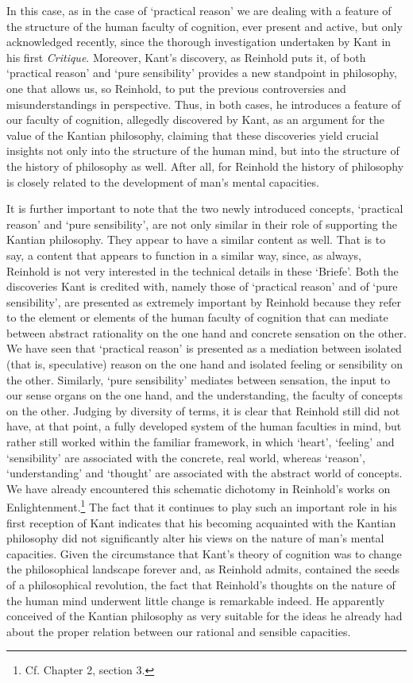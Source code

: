 In this case, as in the case of `practical reason' we are dealing with a feature of the structure of the human faculty of cognition, ever present and active, but only acknowledged recently, since the thorough investigation undertaken by Kant in his first \textit{Critique}. Moreover, Kant's discovery, as Reinhold puts it, of both `practical reason' and `pure sensibility' provides a new standpoint in philosophy, one that allows us, so Reinhold, to put the previous controversies and misunderstandings in perspective. Thus, in both cases, he introduces a feature of our faculty of cognition, allegedly discovered by Kant, as an argument for the value of the Kantian philosophy, claiming that these discoveries yield crucial insights not only into the structure of the human mind, but into the structure of the history of philosophy as well. After all, for Reinhold the history of philosophy is closely related to the development of man's mental capacities. 

 It is further important to note that the two newly introduced concepts, `practical reason' and `pure sensibility', are not only similar in their role of supporting the Kantian philosophy. They appear to have a similar content as well. That is to say, a content that appears to function in a similar way, since, as always, Reinhold is not very interested in the technical details in these `Briefe'. Both the discoveries Kant is credited with, namely those of `practical reason' and of `pure sensibility', are presented as extremely important by Reinhold because they refer to the element or elements of the human faculty of cognition that can mediate between abstract rationality on the one hand and concrete sensation on the other. We have seen that `practical reason' is presented as a mediation between isolated (that is, speculative) reason on the one hand and isolated feeling or sensibility on the other. Similarly, `pure sensibility' mediates between sensation, the input to our sense organs on the one hand, and the understanding, the faculty of concepts on the other. Judging by diversity of terms, it is clear that Reinhold still did not have, at that point, a fully developed system of the human faculties in mind, but rather still worked within the familiar framework, in which `heart', `feeling' and `sensibility' are associated with the concrete, real world, whereas `reason', `understanding' and `thought' are associated with the abstract world of concepts. We have already encountered this schematic dichotomy in Reinhold's works on Enlightenment.\footnote{ Cf. Chapter 2, section 3. } The fact that it continues to play such an important role in his first reception of Kant indicates that his becoming acquainted with the Kantian philosophy did not significantly alter his views on the nature of man's mental capacities. Given the circumstance that Kant's theory of cognition was to change the philosophical landscape forever and, as Reinhold admits, contained the seeds of a philosophical revolution, the fact that Reinhold's thoughts on the nature of the human mind underwent little change is remarkable indeed. He apparently conceived of the Kantian philosophy as very suitable for the ideas he already had about the proper relation between our rational and sensible capacities. 

